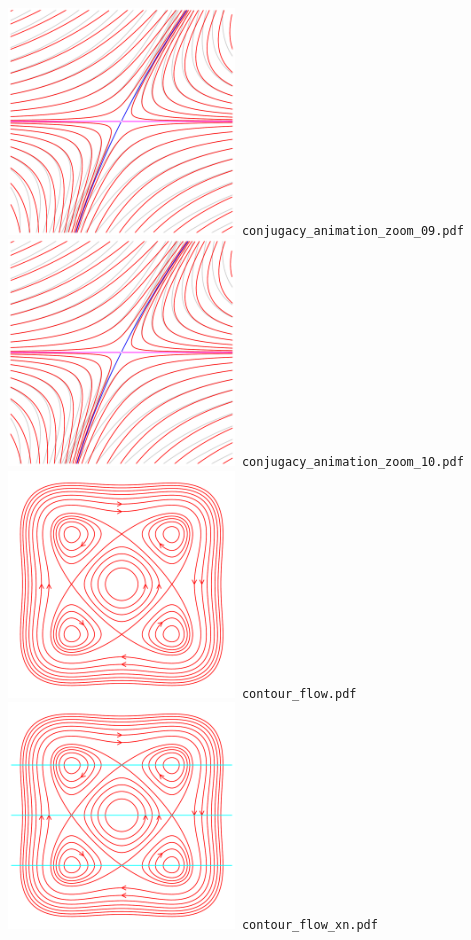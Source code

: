 \documentclass[a4paper]{amsart}
\begin{document}
\includegraphics[width=6cm]{conjugacy_animation_zoom_09.pdf}\verb+ conjugacy_animation_zoom_09.pdf+\\
\includegraphics[width=6cm]{conjugacy_animation_zoom_10.pdf}\verb+ conjugacy_animation_zoom_10.pdf+\\
\includegraphics[width=6cm]{contour_flow.pdf}\verb+ contour_flow.pdf+\\
\includegraphics[width=6cm]{contour_flow_xn.pdf}\verb+ contour_flow_xn.pdf+\\
\end{document}
